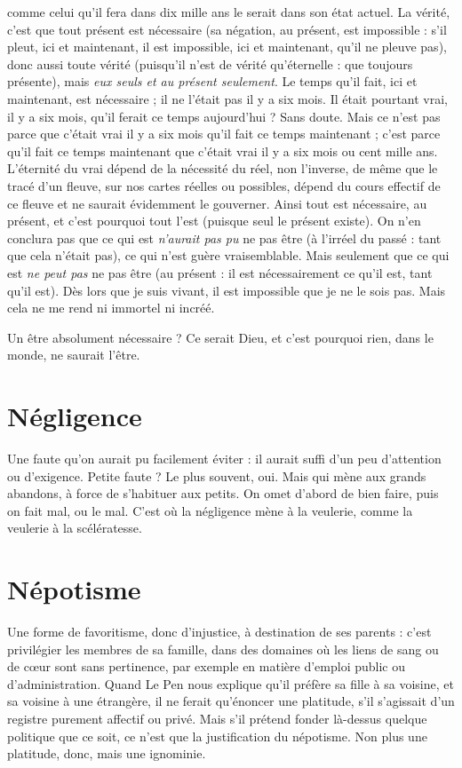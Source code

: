 comme celui qu’il fera dans dix mille ans le serait dans son état actuel. La
vérité, c'est que tout présent est nécessaire (sa négation, au présent, est
impossible : s’il pleut, ici et maintenant, il est impossible, ici et maintenant,
qu'il ne pleuve pas), donc aussi toute vérité (puisqu'il n’est de vérité
qu'éternelle : que toujours présente), mais {\it eux seuls et au présent seulement}. Le
temps qu’il fait, ici et maintenant, est nécessaire ; il ne l’était pas il y a six mois.
Il était pourtant vrai, il y a six mois, qu’il ferait ce temps aujourd’hui ? Sans
doute. Mais ce n’est pas parce que c'était vrai il y a six mois qu’il fait ce temps
maintenant ; c’est parce qu'il fait ce temps maintenant que c'était vrai il y a six
mois ou cent mille ans. L’éternité du vrai dépend de la nécessité du réel, non
l'inverse, de même que le tracé d’un fleuve, sur nos cartes réelles ou possibles,
dépend du cours effectif de ce fleuve et ne saurait évidemment le gouverner.
Ainsi tout est nécessaire, au présent, et c’est pourquoi tout l’est (puisque seul le
présent existe). On n’en conclura pas que ce qui est {\it n'aurait pas pu} ne pas être
(à l’irréel du passé : tant que cela n’était pas), ce qui n’est guère vraisemblable.
Mais seulement que ce qui est {\it ne peut pas} ne pas être (au présent : il est nécessairement
ce qu'il est, tant qu'il est). Dès lors que je suis vivant, il est impossible
que je ne le sois pas. Mais cela ne me rend ni immortel ni incréé.

Un être absolument nécessaire ? Ce serait Dieu, et c’est pourquoi rien, dans
le monde, ne saurait l'être.

\section{Négligence}
Une faute qu’on aurait pu facilement éviter : il aurait suffi
d’un peu d’attention ou d’exigence. Petite faute ? Le plus
souvent, oui. Mais qui mène aux grands abandons, à force de s’habituer aux
petits. On omet d’abord de bien faire, puis on fait mal, ou le mal. C’est où la
négligence mène à la veulerie, comme la veulerie à la scélératesse.

\section{Népotisme}
Une forme de favoritisme, donc d’injustice, à destination de
ses parents : c’est privilégier les membres de sa famille, dans
des domaines où les liens de sang ou de cœur sont sans pertinence, par exemple
en matière d'emploi public ou d'administration. Quand Le Pen nous explique
qu’il préfère sa fille à sa voisine, et sa voisine à une étrangère, il ne ferait
qu'énoncer une platitude, s’il s'agissait d’un registre purement affectif ou privé.
Mais s’il prétend fonder là-dessus quelque politique que ce soit, ce n’est que la
justification du népotisme. Non plus une platitude, donc, mais une ignominie.


